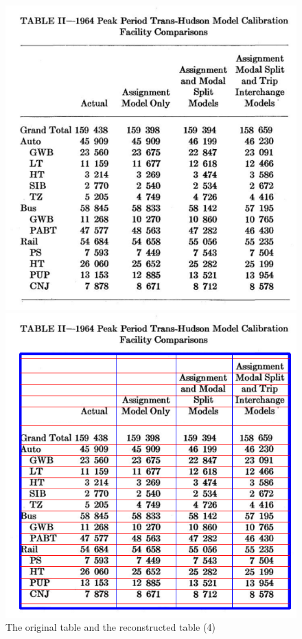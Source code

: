 \documentclass[12pt, a4paper]{article}
\theoremstyle{definition}
\begin{document}
\begin{figure}[htbp]
	\centering
		\begin{minipage}[t]{0.4\linewidth}
		\centering
		\includegraphics[width=\linewidth]{4.png}
		\end{minipage}
		\begin{minipage}[t]{0.4\linewidth}
		\centering
		\includegraphics[width=\linewidth]{reconstructed_4.png}
		\end{minipage}
	\caption{The original table and the reconstructed table (4)}
	\label{fig4}
\end{figure}
\end{document}
